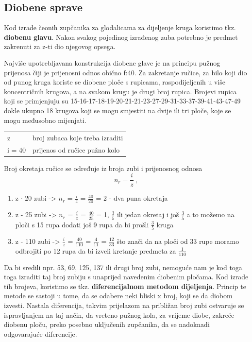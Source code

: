 \documentclass[a4paper,12pt]{article}
\numberwithin{figure}{section}
\begin{document}
\subsection{Diobene sprave}
Kod izrade čeonih zupčanika za glodalicama za dijeljenje kruga koristimo tkz. \textbf{diobenu glavu}. Nakon svakog pojedinog izrađenog zuba potrebno je predmet zakrenuti za z-ti dio njegovog opsega.\par
Najviše upotrebljavana konstrukcija diobene glave je na principu pužnog prijenosa čiji je prijenosni odnos obično f:40. Za zakretanje ručice, za bilo koji dio od punog kruga koriste se diobene ploče s rupicama, raspodijeljenih u više koncentričnih krugova, a na svakom krugu je drugi broj rupica. Brojevi rupica koji se primjenjuju su 15-16-17-18-19-20-21-21-23-27-29-31-33-37-39-41-43-47-49 dokle ukupno 18 krugova koji se mogu smjestiti na dvije ili tri ploče, koje se mogu međusobno mijenjati.
\begin{table}[]
\centering
\begin{tabular}{ll}
z      & broj zubaca koje treba izraditi \\
i = 40 & prijenos od ručice pužno kolo  
\end{tabular}
\end{table}
\FloatBarrier
Broj okretaja ručice se određuje iz broja zubi i prijenosnog odnosa
\begin{equation}
n_{r} = \frac{i}{z}\:,
\end{equation}
\begin{enumerate}
\item z $\cdot$ 20 zubi -> $\displaystyle{n_{r}}$ = $\displaystyle{\frac{i}{z}}$ = $\displaystyle{\frac{40}{20}}$ = 2 - dva puna okretaja
\item z - 25 zubi -> $n_{r}$ = $\displaystyle{\frac{i}{z}}$ = $\displaystyle{\frac{40}{25}}$ = 1, $\displaystyle{\frac{3}{5}}$ ili jedan okretaj i još $\displaystyle{\frac{3}{5}}$ a to možemo na ploči s 15 rupa dodati još 9 rupa da bi prošli $\displaystyle{\frac{3}{5}}$ kruga
\item z - 110 zubi -> $\displaystyle{\frac{i}{z}}$ = $\displaystyle{\frac{40}{110}}$ = $\displaystyle{\frac{4}{11}}$ = $\displaystyle{\frac{12}{33}}$ što znači da na ploči od 33 rupe moramo odbrojiti po 12 rupa da bi izveli kretanje predmeta za $\displaystyle{\frac{1}{110}}$
\end{enumerate}
Da bi sredili npr. 53, 69, 125, 137 ili drugi broj zubi, nemoguće nam je kod toga toga izraditi taj broj zubiju s unaprijed navedenim diobenim pločama. Kod izrade tih brojeva, koristimo se tkz. \textbf{diferencijalnom metodom dijeljenja}. Princip te metode se sastoji u tome, da se odabere neki bliski x broj, koji se da diobom izvesti. Nastala diferencija, takvim prijelazom na približan broj zubi ostvaruje se ispravljanjem na taj način, da vreteno pužnog kola, za vrijeme diobe, zakreće diobenu ploču, preko posebno uključenih zupčanika, da se nadoknadi odgovarajuće diferencije.
\end{document}
